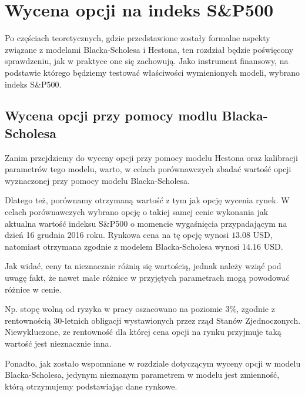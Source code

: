 \documentclass{pracamgr}
\begin{document}


\chapter{Wycena opcji na indeks S\&P500}\label{r:sp}


Po częściach teoretycznych, gdzie przedstawione zostały formalne aspekty związane z modelami 
Blacka-Scholesa i Hestona, ten rozdział będzie poświęcony sprawdzeniu, jak w praktyce one się zachowują.
Jako instrument finansowy, na podstawie którego będziemy testować właściwości wymienionych modeli, 
wybrano indeks S\&P500. 

\section{Wycena opcji przy pomocy modlu Blacka-Scholesa}

Zanim przejdziemy do wyceny opcji  przy pomocy modelu Hestona oraz kalibracji
parametrów tego modelu, warto, w celach porównawczych zbadać wartość opcji 
wyznaczonej przy pomocy modelu Blacka-Scholesa. 


Dlatego też, porównamy otrzymaną wartość z tym jak opcję wycenia rynek.
W celach porównawczych wybrano opcję o takiej samej cenie wykonania jak aktualna wartość indeksu S\&P500 o 
momencie wygaśnięcia przypadającym na dzień 16 grudnia 2016 roku. Rynkowa cena na tę opcję wynosi $13.08$ USD, natomiast otrzymana zgodnie z modelem Blacka-Scholesa wynosi $14.16$ USD.

Jak widać, ceny ta nieznacznie różnią się wartością, jednak należy wziąć pod uwagę fakt, że nawet małe różnice w przyjętych parametrach mogą powodować różnice w cenie. 

Np. stopę wolną od ryzyka w pracy oszacowano na poziomie 3$\%$, zgodnie z rentownością 30-letnich obligacji wystawionych przez rząd Stanów Zjednoczonych. Niewykluczone, ze rentowność dla której cena opcji na rynku przyjmuje taką wartość jest nieznacznie inna.

Ponadto, jak zostało wspomniane w rozdziale dotyczącym wyceny opcji w modelu Blacka-Scholesa,
jedynym nieznanym parametrem w modelu jest zmienność, którą otrzymujemy podstawiając
dane rynkowe. 
\end{document}
